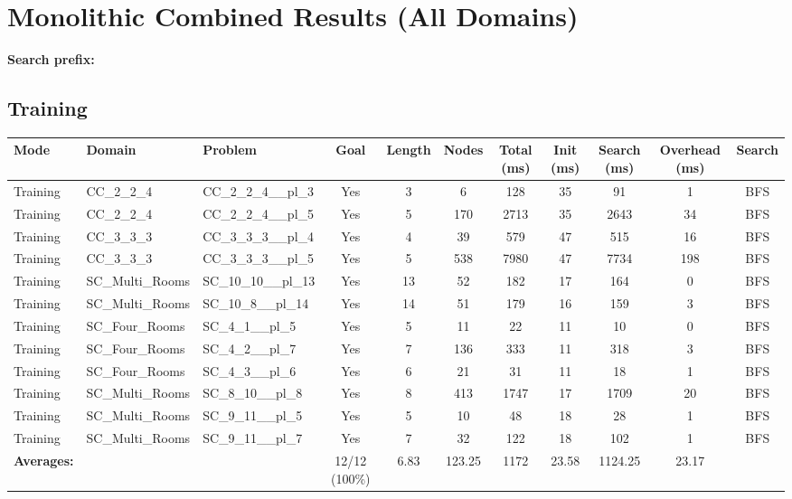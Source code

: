 \documentclass{article}
\begin{document}
\section*{Monolithic Combined Results (All Domains)}
\textbf{Search prefix:} 
\\[0.5cm]
\subsection*{Training}
\begin{tabular}{lllcccccccc}
\toprule
Mode & Domain & Problem & Goal & Length & Nodes & Total (ms) & Init (ms) & Search (ms) & Overhead (ms) & Search \\
\midrule
Training & CC\_2\_2\_4 & CC\_2\_2\_4\_\_pl\_3 & Yes & 3 & 6 & 128 & 35 & 91 & 1 & BFS \\
Training & CC\_2\_2\_4 & CC\_2\_2\_4\_\_pl\_5 & Yes & 5 & 170 & 2713 & 35 & 2643 & 34 & BFS \\
Training & CC\_3\_3\_3 & CC\_3\_3\_3\_\_pl\_4 & Yes & 4 & 39 & 579 & 47 & 515 & 16 & BFS \\
Training & CC\_3\_3\_3 & CC\_3\_3\_3\_\_pl\_5 & Yes & 5 & 538 & 7980 & 47 & 7734 & 198 & BFS \\
Training & SC\_Multi\_Rooms & SC\_10\_10\_\_pl\_13 & Yes & 13 & 52 & 182 & 17 & 164 & 0 & BFS \\
Training & SC\_Multi\_Rooms & SC\_10\_8\_\_pl\_14 & Yes & 14 & 51 & 179 & 16 & 159 & 3 & BFS \\
Training & SC\_Four\_Rooms & SC\_4\_1\_\_pl\_5 & Yes & 5 & 11 & 22 & 11 & 10 & 0 & BFS \\
Training & SC\_Four\_Rooms & SC\_4\_2\_\_pl\_7 & Yes & 7 & 136 & 333 & 11 & 318 & 3 & BFS \\
Training & SC\_Four\_Rooms & SC\_4\_3\_\_pl\_6 & Yes & 6 & 21 & 31 & 11 & 18 & 1 & BFS \\
Training & SC\_Multi\_Rooms & SC\_8\_10\_\_pl\_8 & Yes & 8 & 413 & 1747 & 17 & 1709 & 20 & BFS \\
Training & SC\_Multi\_Rooms & SC\_9\_11\_\_pl\_5 & Yes & 5 & 10 & 48 & 18 & 28 & 1 & BFS \\
Training & SC\_Multi\_Rooms & SC\_9\_11\_\_pl\_7 & Yes & 7 & 32 & 122 & 18 & 102 & 1 & BFS \\
\textbf{Averages:} & & & 12/12 (100\%) & 6.83 & 123.25 & 1172 & 23.58 & 1124.25 & 23.17 & \\
\bottomrule
\end{tabular}
\newpage
\end{document}
